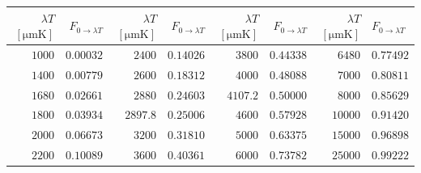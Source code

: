 \par\smallskip\noindent
\begin{minipage}{\linewidth}
\label{tab:12:blackbody-fraction}
\footnotesize
\setlength{\tabcolsep}{4pt}
\renewcommand{\arraystretch}{1.12}
\begin{tabularx}{\linewidth}{@{}r r r r r r r X@{}}
\toprule
$\lambda T$ $[\si{\micro\meter\kelvin}]$ & $F_{0\to\lambda T}$ & $\lambda T$ $[\si{\micro\meter\kelvin}]$ & $F_{0\to\lambda T}$ & $\lambda T$ $[\si{\micro\meter\kelvin}]$ & $F_{0\to\lambda T}$ & $\lambda T$ $[\si{\micro\meter\kelvin}]$ & $F_{0\to\lambda T}$ \\
\midrule
$1000$ & $0.00032$ & $2400$ & $0.14026$ & $3800$ & $0.44338$ & $6480$ & $0.77492$ \\
$1400$ & $0.00779$ & $2600$ & $0.18312$ & $4000$ & $0.48088$ & $7000$ & $0.80811$ \\
$1680$ & $0.02661$ & $2880$ & $0.24603$ & $4107.2$ & $0.50000$ & $8000$ & $0.85629$ \\
$1800$ & $0.03934$ & $2897.8$ & $0.25006$ & $4600$ & $0.57928$ & $10000$ & $0.91420$ \\
$2000$ & $0.06673$ & $3200$ & $0.31810$ & $5000$ & $0.63375$ & $15000$ & $0.96898$ \\
$2200$ & $0.10089$ & $3600$ & $0.40361$ & $6000$ & $0.73782$ & $25000$ & $0.99222$ \\
\bottomrule
\end{tabularx}
\end{minipage}
\par\smallskip

